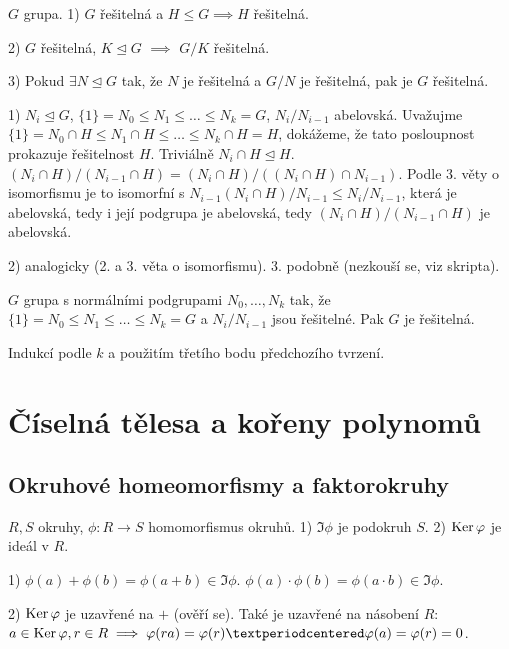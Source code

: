 \documentclass[12pt]{article}                   %
\begin{document}
        \begin{tvrzeni}
            $G$ grupa. 1) $G$ řešitelná a $H ≤ G \implies H$ řešitelná.

            2) $G$ řešitelná, $K \trianglelefteq G$ $\implies$ $G/K$ řešitelná.

            3) Pokud $\exists N \trianglelefteq G$ tak, že $N$ je řešitelná a $G / N$ je řešitelná, pak je $G$ řešitelná.

            \begin{dukazin}
                1) $N_i \trianglelefteq G$, $\{1\} = N_0 ≤ N_1 ≤ … ≤ N_k = G$, $N_i / N_{i-1}$ abelovská. Uvažujme $\{1\} = N_0 \cap H ≤ N_1 \cap H ≤ … ≤ N_k \cap H = H$, dokážeme, že tato posloupnost prokazuje řešitelnost $H$. Triviálně $N_i \cap H \trianglelefteq H$. $(N_i\cap H)/(N_{i-1} \cap H) = (N_i \cap H)/((N_i \cap H) \cap N_{i-1})$. Podle 3. věty o isomorfismu je to isomorfní s $N_{i-1}(N_i \cap H) / N_{i-1} ≤ N_i / N_{i-1}$, která je abelovská, tedy i její podgrupa je abelovská, tedy $(N_i \cap H)/(N_{i-1} \cap H)$ je abelovská.

                2) analogicky (2. a 3. věta o isomorfismu). 3. podobně (nezkouší se, viz skripta).
            \end{dukazin}
        \end{tvrzeni}

        \begin{dusledek}
            $G$ grupa s normálními podgrupami $N_0, …, N_k$ tak, že $\{1\} = N_0 ≤ N_1 ≤ … ≤ N_k = G$ a $N_i/N_{i-1}$ jsou řešitelné. Pak $G$ je řešitelná.

            \begin{dukazin}
                Indukcí podle $k$ a použitím třetího bodu předchozího tvrzení.
            \end{dukazin}
        \end{dusledek}

\section{Číselná tělesa a kořeny polynomů}
    \subsection{Okruhové homeomorfismy a faktorokruhy}
        \begin{tvrzeni}
            $R, S$ okruhy, $\phi: R \rightarrow S$ homomorfismus okruhů. 1) $\Im \phi$ je podokruh $S$. 2) $\operatorname{Ker} \varphi$ je ideál v $R$.

            \begin{dukazin}
                1) $\phi(a) + \phi(b) = \phi(a+b) \in \Im \phi$. $\phi(a)·\phi(b) = \phi(a·b) \in \Im \phi$.

                2) $\operatorname{Ker} \varphi$ je uzavřené na $+$ (ověří se). Také je uzavřené na násobení $R$: $a \in \Ker \phi, r \in R \implies \phi(ra) = \phi(r)·\phi(a) = \phi(r) = 0$.
            \end{dukazin}
        \end{tvrzeni}
\end{document}
